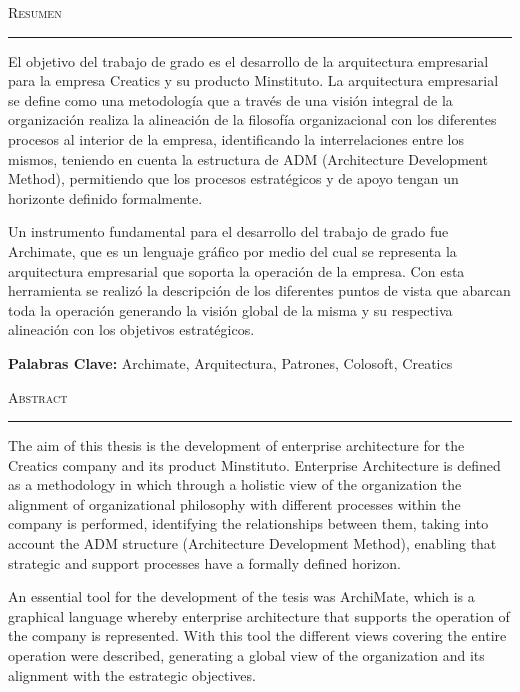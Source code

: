 \vspace*{3cm}
\noindent\Huge\textsc{Resumen}\\
\normalsize
\noindent\rule[2pt]{\textwidth}{0.8pt}
\hspace*{3cm}

El objetivo del trabajo de grado es el desarrollo de la arquitectura empresarial para la empresa Creatics y su producto Minstituto. La arquitectura empresarial se define como una metodología que a través de una visión integral de la organización realiza la alineación de la filosofía organizacional con los diferentes procesos al interior de la empresa, identificando la interrelaciones entre los mismos, teniendo en cuenta la estructura de ADM (Architecture Development Method), permitiendo que los procesos estratégicos y de apoyo tengan un horizonte definido formalmente.

Un instrumento fundamental para el desarrollo del trabajo de grado fue Archimate, que es un lenguaje gráfico por medio del cual se representa la arquitectura empresarial que soporta la operación de la empresa. Con esta herramienta se realizó la descripción de los diferentes puntos de vista que abarcan toda la operación generando la visión global de la misma y su respectiva alineación con los objetivos estratégicos.

{\large\textbf{Palabras Clave:}}
Archimate, Arquitectura, Patrones, Colosoft, Creatics

\newpage
{}
\vspace*{3cm}
\noindent\Huge\textsc{Abstract}\\
\normalsize
\noindent\rule[2pt]{\textwidth}{0.8pt}
\hspace*{3cm}

The aim of this thesis is the development of enterprise architecture for the Creatics company and its product Minstituto. Enterprise Architecture is defined as a methodology in which through a holistic view of the organization the alignment of organizational philosophy with different processes within the company is performed, identifying the relationships between them, taking into account the ADM structure (Architecture Development Method), enabling that strategic and support processes have a formally defined horizon.

An essential tool for the development of the tesis was ArchiMate, which is a graphical language whereby enterprise architecture that supports the operation of the company is represented. With this tool the different views covering the entire operation were described, generating a global view of the organization and its alignment with the estrategic objectives.